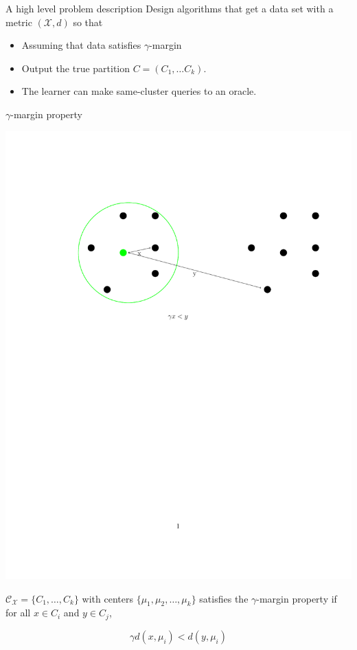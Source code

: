 \documentclass{beamer}
\newcommand{\mc}{\mathcal}
\begin{document}
\begin{frame}{A high level problem description}
	Design algorithms that get a data set with a metric $(\mc X, d)$ so that
	\vspace{1cm}
	\begin{itemize}
		\item Assuming that data satisfies $\gamma$-margin
		\vspace{1.0cm}
		\item Output the true partition $C=(C_1, \ldots C_k)$.
		\vspace{1.0cm}
		\item The learner can make same-cluster queries to an oracle.
	\end{itemize}
\end{frame}

\begin{frame}{$\gamma$-margin property}
	\begin{center}        
	    \includegraphics[trim=500 470 500 190,scale=0.5]{figures/gammaMargin.pdf}
    \end{center}    
    
    \begin{block}{}
    $\mc C_{\mc X} = \{C_1, \ldots, C_k\}$ with centers $\{\mu_1, \mu_2, \ldots , \mu_k\}$ satisfies the $\gamma$-margin property if for all $x \in C_i$ and $y \in C_j$,

	$$\gamma d(x, \mu_i) < d(y, \mu_i)$$   
    \end{block}    
\end{frame}
\end{document}
